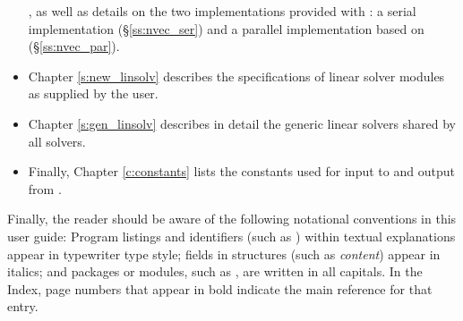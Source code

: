 \begin{itemize}
  {\sundials}, as well as details on the two {\nvector}
  implementations provided with {\sundials}: a serial implementation
  (\S\ref{ss:nvec_ser}) and a parallel implementation based on
  {\mpi} (\S\ref{ss:nvec_par}).
\item
  Chapter \ref{s:new_linsolv} describes the specifications of linear
  solver modules as supplied by the user.
\item
  Chapter \ref{s:gen_linsolv} describes in detail the generic linear solvers shared 
  by all {\sundials} solvers.
\item
  Finally, Chapter \ref{c:constants} lists the constants used for input to
  and output from {\cvodes}.
\end{itemize}

Finally, the reader should be aware of the following notational conventions
in this user guide:  Program listings and identifiers (such as ) 
within textual explanations appear in typewriter type style; 
fields in {\C} structures (such as {\em content}) appear in italics;
and packages or modules, such as {\cvdense}, are written in all capitals. 
In the Index, page numbers that appear in bold indicate the main reference
for that entry.